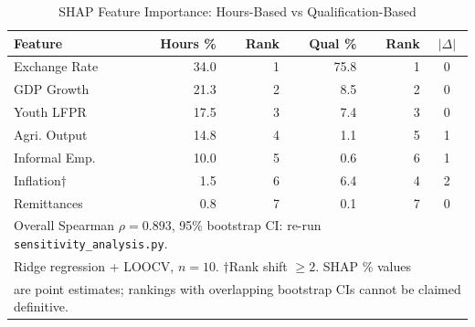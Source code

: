 \begin{table}[ht]
\caption{SHAP Feature Importance: Hours-Based vs Qualification-Based}
\label{tab:shap_sensitivity}
\setlength{\tabcolsep}{3pt}
\footnotesize
\begin{tabular}{lrrrrc}
\toprule
\textbf{Feature} & \textbf{Hours \%} & \textbf{Rank} & \textbf{Qual \%} & \textbf{Rank} & \textbf{$|\Delta|$}\\
\midrule
Exchange Rate & 34.0 & 1 & 75.8 & 1 & 0\\
GDP Growth & 21.3 & 2 & 8.5 & 2 & 0\\
Youth LFPR & 17.5 & 3 & 7.4 & 3 & 0\\
Agri. Output & 14.8 & 4 & 1.1 & 5 & 1\\
Informal Emp. & 10.0 & 5 & 0.6 & 6 & 1\\
Inflation$\dagger$ & 1.5 & 6 & 6.4 & 4 & 2\\
Remittances & 0.8 & 7 & 0.1 & 7 & 0\\
\midrule
\multicolumn{6}{l}{\scriptsize Overall Spearman $\rho = 0.893$, 95\% bootstrap CI: re-run \texttt{sensitivity\_analysis.py}.}\\
\multicolumn{6}{l}{\scriptsize Ridge regression + LOOCV, $n=10$. $\dagger$Rank shift $\geq 2$. SHAP \% values}\\
\multicolumn{6}{l}{\scriptsize are point estimates; rankings with overlapping bootstrap CIs cannot be claimed definitive.}\\
\bottomrule
\end{tabular}
\end{table}
